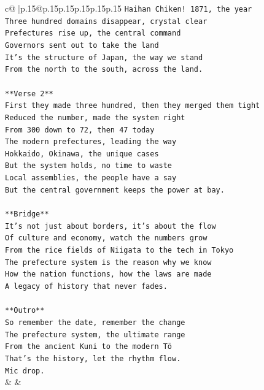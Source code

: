 \documentclass{article}
\begin{document}
{\begin{supertabular}{c@{$\;$}|p{.15\linewidth}@{}p{.15\linewidth}p{.15\linewidth}p{.15\linewidth}p{.15\linewidth}p{.15\linewidth}}
{{{\texttt{Haihan Chiken! 1871, the year} \\
\texttt{Three hundred domains disappear, crystal clear} \\
\texttt{Prefectures rise up, the central command} \\
\texttt{Governors sent out to take the land} \\
\texttt{It's the structure of Japan, the way we stand} \\
\texttt{From the north to the south, across the land.} \\
\\ 
\texttt{**Verse 2**} \\
\texttt{First they made three hundred, then they merged them tight} \\
\texttt{Reduced the number, made the system right} \\
\texttt{From 300 down to 72, then 47 today} \\
\texttt{The modern prefectures, leading the way} \\
\texttt{Hokkaido, Okinawa, the unique cases} \\
\texttt{But the system holds, no time to waste} \\
\texttt{Local assemblies, the people have a say} \\
\texttt{But the central government keeps the power at bay.} \\
\\ 
\texttt{**Bridge**} \\
\texttt{It's not just about borders, it's about the flow} \\
\texttt{Of culture and economy, watch the numbers grow} \\
\texttt{From the rice fields of Niigata to the tech in Tokyo} \\
\texttt{The prefecture system is the reason why we know} \\
\texttt{How the nation functions, how the laws are made} \\
\texttt{A legacy of history that never fades.} \\
\\ 
\texttt{**Outro**} \\
\texttt{So remember the date, remember the change} \\
\texttt{The prefecture system, the ultimate range} \\
\texttt{From the ancient Kuni to the modern Tō} \\
\texttt{That's the history, let the rhythm flow.} \\
\texttt{Mic drop.} \\
            }
        }
    }
    & & \\ \\


\end{supertabular}}
\end{document}
